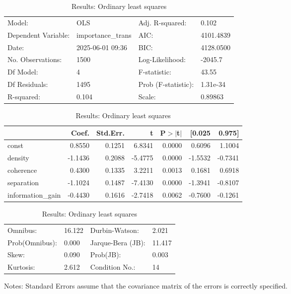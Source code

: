 \begin{table}
\caption{Results: Ordinary least squares}
\label{}
\begin{center}
\begin{tabular}{llll}
\hline
Model:              & OLS               & Adj. R-squared:     & 0.102      \\
Dependent Variable: & importance\_trans & AIC:                & 4101.4839  \\
Date:               & 2025-06-01 09:36  & BIC:                & 4128.0500  \\
No. Observations:   & 1500              & Log-Likelihood:     & -2045.7    \\
Df Model:           & 4                 & F-statistic:        & 43.55      \\
Df Residuals:       & 1495              & Prob (F-statistic): & 1.31e-34   \\
R-squared:          & 0.104             & Scale:              & 0.89863    \\
\hline
\end{tabular}
\end{center}

\begin{center}
\begin{tabular}{lrrrrrr}
\hline
                  &   Coef. & Std.Err. &       t & P$> |$t$|$ &  [0.025 &  0.975]  \\
\hline
const             &  0.8550 &   0.1251 &  6.8341 &      0.0000 &  0.6096 &  1.1004  \\
density           & -1.1436 &   0.2088 & -5.4775 &      0.0000 & -1.5532 & -0.7341  \\
coherence         &  0.4300 &   0.1335 &  3.2211 &      0.0013 &  0.1681 &  0.6918  \\
separation        & -1.1024 &   0.1487 & -7.4130 &      0.0000 & -1.3941 & -0.8107  \\
information\_gain & -0.4430 &   0.1616 & -2.7418 &      0.0062 & -0.7600 & -0.1261  \\
\hline
\end{tabular}
\end{center}

\begin{center}
\begin{tabular}{llll}
\hline
Omnibus:       & 16.122 & Durbin-Watson:    & 2.021   \\
Prob(Omnibus): & 0.000  & Jarque-Bera (JB): & 11.417  \\
Skew:          & 0.090  & Prob(JB):         & 0.003   \\
Kurtosis:      & 2.612  & Condition No.:    & 14      \\
\hline
\end{tabular}
\end{center}
\end{table}
\bigskip
Notes: \newline 
[1] Standard Errors assume that the covariance matrix of the errors is correctly specified.